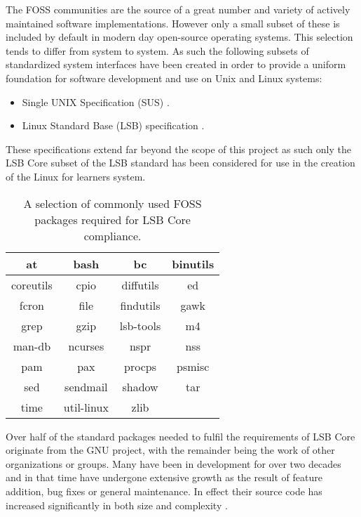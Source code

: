 The FOSS communities are the source of a great number and variety of actively maintained software implementations. However only a small subset of these is included by default in modern day open-source operating systems. This selection tends to differ from system to system. As such the following subsets of standardized system interfaces have been created in order to provide a uniform foundation for software development and use on Unix and Linux systems:

\begin{itemize}
    \item Single UNIX Specification (SUS) \cite{susv4}.
    \item Linux Standard Base (LSB) specification \cite{lsb}.
\end{itemize}

These specifications extend far beyond the scope of this project as such only the LSB Core subset of the LSB standard has been considered for use in the creation of the Linux for learners system.

\begin{table}[H]
    \centering
    \begin{tabular}{|c|c|c|c|}
        \hline
        at & bash & bc & binutils \\
        \hline
        coreutils & cpio & diffutils & ed \\
        \hline
        fcron & file & findutils & gawk \\
        \hline
        grep & gzip & lsb-tools & m4 \\
        \hline
        man-db & ncurses & nspr & nss \\
        \hline
        pam & pax & procps & psmisc \\
        \hline
        sed & sendmail & shadow & tar \\
        \hline
        time & util-linux & zlib \\
        \cline{1-3}
    \end{tabular}
    \caption{A selection of commonly used FOSS packages required for LSB Core compliance.}
    \label{table:LSB Core}
\end{table}

Over half of the standard packages needed to fulfil the requirements of LSB Core originate from the GNU project, with the remainder being the work of other organizations or groups. Many have been in development for over two decades and in that time have undergone extensive growth as the result of feature addition, bug fixes or general maintenance. In effect their source code has increased significantly in both size and complexity \cite{Succi2001PreliminaryRF,Quach2018DebloatingST,Quach2019BloatFA}.

